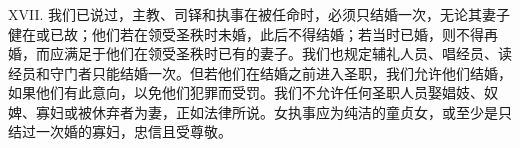 \subsubsection{}

XVII. 我们已说过，主教、司铎和执事在被任命时，必须只结婚一次，无论其妻子健在或已故；他们若在领受圣秩时未婚，此后不得结婚；若当时已婚，则不得再婚，而应满足于他们在领受圣秩时已有的妻子。我们也规定辅礼人员、唱经员、读经员和守门者只能结婚一次。但若他们在结婚之前进入圣职，我们允许他们结婚，如果他们有此意向，以免他们犯罪而受罚。我们不允许任何圣职人员娶娼妓、奴婢、寡妇或被休弃者为妻，正如法律所说。女执事应为纯洁的童贞女，或至少是只结过一次婚的寡妇，忠信且受尊敬。\par


\subsubsection{}


